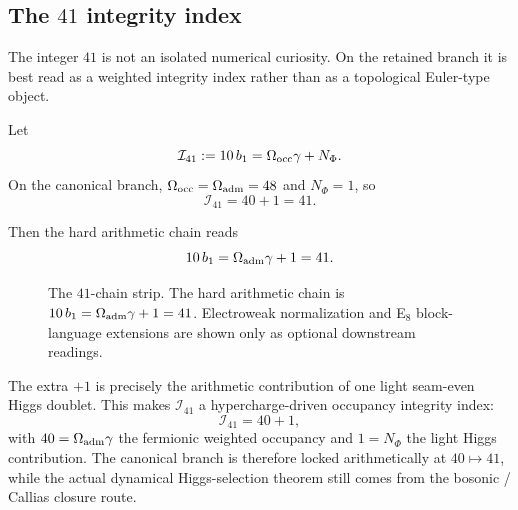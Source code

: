 \subsection{The \texorpdfstring{$41$}{41} integrity index}

The integer $41$ is not an isolated numerical curiosity. On the retained branch it is best read as a weighted integrity index rather than as a topological Euler-type object.
\begin{definition}
\label{def:integrity-index-41}
Let
\[
\mathcal I_{41}:=10\,b_1=\Omega_{\mathrm{occ}}\gamma+N_\Phi.
\]
On the canonical branch, $\Omega_{\mathrm{occ}}=\Omega_{\mathrm{adm}}=48$ and $N_\Phi=1$, so
\[
\mathcal I_{41}=40+1=41.
\]
\end{definition}

Then the hard arithmetic chain reads
\begin{equation}
\label{eq:41-chain-main}
10\,b_1
=
\Omega_{\mathrm{adm}}\gamma+1
=
41.
\end{equation}
\begin{figure}[t]
\centering
\footnotesize
{}
\caption{The $41$-chain strip. The hard arithmetic chain is $10\,b_1=\Omega_{\mathrm{adm}}\gamma+1=41$. Electroweak normalization and E$_8$ block-language extensions are shown only as optional downstream readings.}
\label{fig:41-chain-strip}
\end{figure}
The extra $+1$ is precisely the arithmetic contribution of one light seam-even Higgs doublet. This makes $\mathcal I_{41}$ a hypercharge-driven occupancy integrity index:
\[
\mathcal I_{41}=40+1,
\]
with $40=\Omega_{\mathrm{adm}}\gamma$ the fermionic weighted occupancy and $1=N_\Phi$ the light Higgs contribution. The canonical branch is therefore locked arithmetically at $40\mapsto 41$, while the actual dynamical Higgs-selection theorem still comes from the bosonic / Callias closure route.

